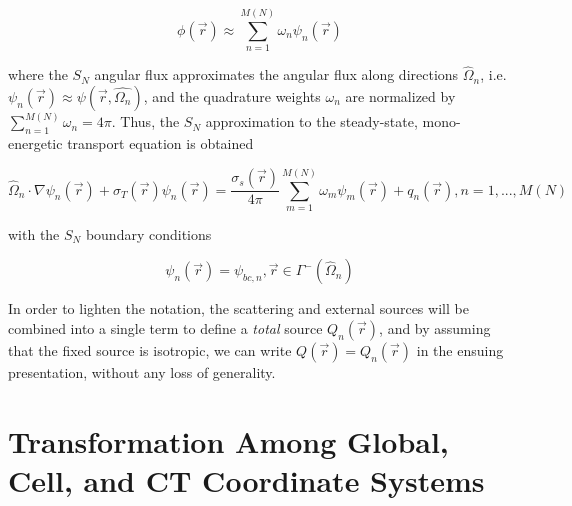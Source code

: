 \begin{equation}
    \phi (\Vec{r} ) \approx \sum_{n=1}^{M(N)} \omega_n \psi_n ( \Vec{r} )
\end{equation}

\noindent where the $S_N$ angular flux approximates the angular flux along directions $\hat{\Omega}_n$, i.e. $\psi_n ( \Vec{r} ) \approx \psi ( \Vec{r} , \hat{\Omega_n} ) $, and the quadrature weights $\omega_n$ are normalized by $\sum_{n=1}^{M(N)} \omega_n = 4 \pi$.
Thus, the $S_N$ approximation to the steady-state, mono-energetic transport equation is obtained

\begin{equation}
    \hat{\Omega}_n  \cdot \nabla \psi_n ( \Vec{r} ) + \sigma_T (\Vec{r}) \psi_n ( \Vec{r} ) = \frac{\sigma_s ( \Vec{r} )}{4 \pi} \sum_{m=1}^{M(N)} \omega_m \psi_m ( \Vec{r} ) + q_n (\Vec{r}), n=1,...,M(N)
\end{equation}

\noindent with the $S_N$ boundary conditions

\begin{equation}
    \psi_n ( \Vec{r} ) = \psi_{bc,n}, \Vec{r} \in \Gamma^- ( \hat{\Omega}_n )
\end{equation}

In order to lighten the notation, the scattering and external sources will be combined into a single term to define a \textit{total} source $Q_n ( \vec{r})$, and by assuming that the fixed source is isotropic, we can write $Q ( \vec{r} ) = Q_n ( \vec{r})$ in the ensuing presentation, without any loss of generality.

\section{Transformation Among Global, Cell, and \ac{CT} Coordinate Systems}

